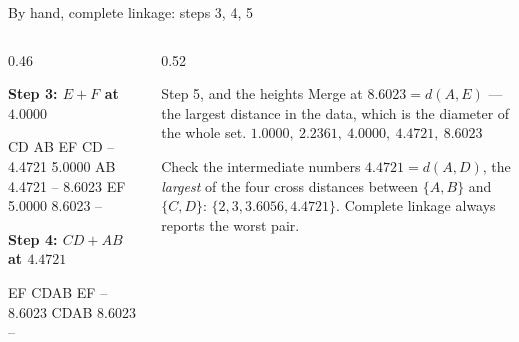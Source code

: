 \documentclass[aspectratio=169]{beamer}
\begin{document}
\begin{frame}[fragile,shrink=4]{By hand, complete linkage: steps 3, 4, 5}
  \begin{columns}[T]
    \begin{column}{0.46\textwidth}
      \begin{center}\small\textbf{Step 3: $E{+}F$ at $4.0000$}\end{center}
\begin{outblk}
                  CD        AB        EF
CD                --    4.4721    5.0000
AB            4.4721        --    8.6023
EF            5.0000    8.6023        --
\end{outblk}
      \begin{center}\small\textbf{Step 4: $CD{+}AB$ at $4.4721$}\end{center}
\begin{outblk}
                  EF      CDAB
EF                --    8.6023
CDAB          8.6023        --
\end{outblk}
    \end{column}
    \begin{column}{0.52\textwidth}
      \begin{exampleblock}{Step 5, and the heights}
        Merge at $8.6023 = d(A,E)$ --- the largest distance in the data, which
        is the diameter of the whole set.
        \medskip
        \centering\large
        $1.0000,\ 2.2361,\ 4.0000,\ 4.4721,\ 8.6023$
      \end{exampleblock}
      \begin{alertblock}{Check the intermediate numbers}
        $4.4721 = d(A,D)$, the \emph{largest} of the four cross distances
        between $\{A,B\}$ and $\{C,D\}$: $\{2, 3, 3.6056, 4.4721\}$. Complete
        linkage always reports the worst pair.
      \end{alertblock}
    \end{column}
  \end{columns}
\end{frame}
\end{document}
